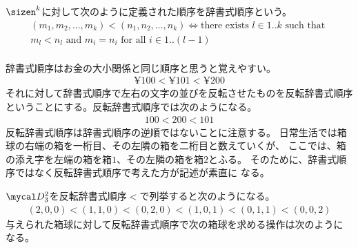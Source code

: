 	\begin{definition}[辞書式順序]\label{def:辞書式順序} %
		$\sizen^k$に対して次のように定義された順序を辞書式順序という。
		\begin{equation*}\begin{split} %
			(m_1,m_2,\dots,m_k) < (n_1,n_2,\dots,n_k)
			\iff \text{there exists }l\in1..k \text{ such that } \\
			m_l < n_l \text{ and }m_i = n_i \text{ for all }i\in1..(l-1) \\
		\end{split}\end{equation*} %
	\end{definition} %

	辞書式順序はお金の大小関係と同じ順序と思うと覚えやすい。
	\begin{equation*}\begin{split} %
		\yen100 < \yen101 < \yen200
	\end{split}\end{equation*} %
	それに対して辞書式順序で左右の文字の並びを反転させたものを反転辞書式順序
	ということにする。反転辞書式順序では次のようになる。
	\begin{equation*}\begin{split} %
		100 < 200 < 101
	\end{split}\end{equation*} %
	反転辞書式順序は辞書式順序の逆順ではないことに注意する。
	日常生活では箱球の右端の箱を一桁目、その左隣の箱を二桁目と数えていくが、
	ここでは、箱の添え字を左端の箱を箱$1$、その左隣の箱を箱$2$とふる。
	そのために、辞書式順序ではなく反転辞書式順序で考えた方が記述が素直に
	なる。

	$\hakodama_3^2$を反転辞書式順序$<$で列挙すると次のようになる。
	\begin{equation*}\begin{split} %
	(2,0,0) < (1,1,0) < (0,2,0) < (1,0,1) < (0,1,1) < (0,0,2)
	\end{split}\end{equation*} %
	与えられた箱球に対して反転辞書式順序で次の箱球を求める操作は次のように
	なる。

